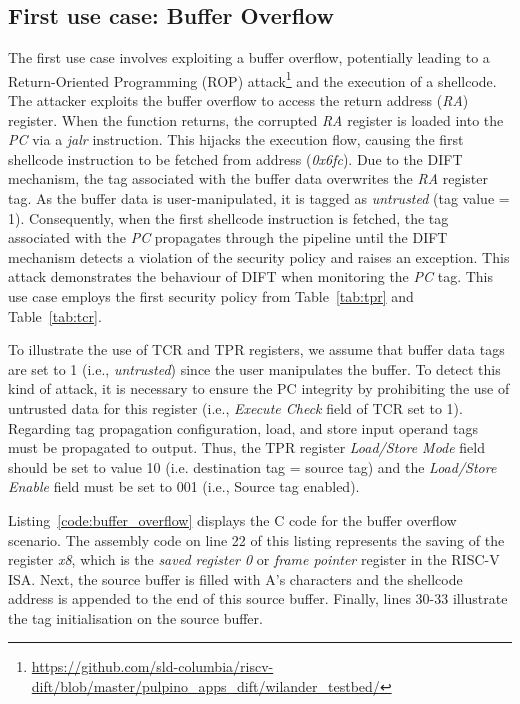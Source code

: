 \subsection{First use case: Buffer Overflow}
The first use case involves exploiting a buffer overflow, potentially leading to a Return-Oriented Programming (ROP) attack\footnote{\url{https://github.com/sld-columbia/riscv-dift/blob/master/pulpino\_apps\_dift/wilander\_testbed/}} and the execution of a shellcode. The attacker exploits the buffer overflow to access the return address (\textit{RA}) register. When the function returns, the corrupted \textit{RA} register is loaded into the \textit{PC} via a \textit{jalr} instruction. This hijacks the execution flow, causing the first shellcode instruction to be fetched from address (\textit{0x6fc}). Due to the DIFT mechanism, the tag associated with the buffer data overwrites the \textit{RA} register tag. As the buffer data is user-manipulated, it is tagged as \textit{untrusted} (tag value = 1). Consequently, when the first shellcode instruction is fetched, the tag associated with the \textit{PC} propagates through the pipeline until the DIFT mechanism detects a violation of the security policy and raises an exception. This attack demonstrates the behaviour of DIFT when monitoring the \textit{PC} tag. This use case employs the first security policy from Table~\ref{tab:tpr} and Table~\ref{tab:tcr}.

To illustrate the use of TCR and TPR registers, we assume that buffer data tags are set to 1 (i.e., \textit{untrusted}) since the user manipulates the buffer.
To detect this kind of attack, it is necessary to ensure the PC integrity by prohibiting the use of untrusted data for this register (i.e., \textit{Execute Check} field of TCR set to 1). Regarding tag propagation configuration, load, and store input operand tags must be propagated to output. Thus, the TPR register \textit{Load/Store Mode} field should be set to value 10 (i.e. destination tag = source tag) and the \textit{Load/Store Enable} field must be set to 001 (i.e., Source tag enabled).

Listing~\ref{code:buffer_overflow} displays the C code for the buffer overflow scenario. The assembly code on line 22 of this listing represents the saving of the register \textit{x8}, which is the \textit{saved register 0} or \textit{frame pointer} register in the RISC-V ISA. Next, the source buffer is filled with A's characters and the shellcode address is appended to the end of this source buffer. Finally, lines 30-33 illustrate the tag initialisation on the source buffer.

